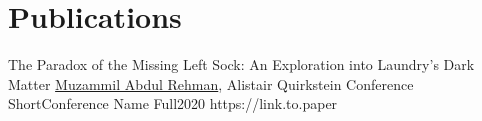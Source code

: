 \section{Publications}
\pubListStart

\pubItem
{The Paradox of the Missing Left Sock: An Exploration into Laundry's Dark Matter}
{\underline{Muzammil Abdul Rehman}, Alistair Quirkstein}
{Conference Short}{Conference Name Full}{2020}
{https://link.to.paper}






\pubListEnd
